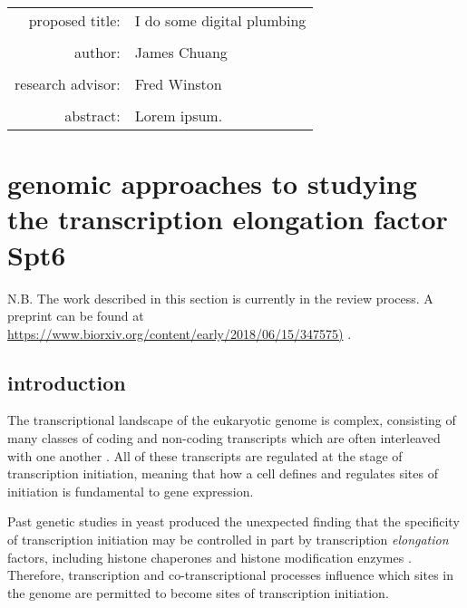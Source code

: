 \documentclass[11pt, a4paper]{article}
\begin{document}
\begin{titlepage}
\begin{tabular}{ r l }
 proposed title:   & I do some digital plumbing \\
 		   & \\
 author:	   & James Chuang \\
 		   & \\
 research advisor: & Fred Winston \\
 		   & \\
 abstract:	   & Lorem ipsum.
\end{tabular}
\end{titlepage}

\tableofcontents

\section{genomic approaches to studying the transcription elongation factor Spt6}

N.B. The work described in this section is currently in the review process. A preprint can be found at \url{https://www.biorxiv.org/content/early/2018/06/15/347575)} \cite{doris2018}.

\subsection{introduction}

The transcriptional landscape of the eukaryotic genome is complex, consisting of many classes of coding and non-coding transcripts which are often interleaved with one another \cite{jensen2013, pelechano2017}. All of these transcripts are regulated at the stage of transcription initiation, meaning that how a cell defines and regulates sites of initiation is fundamental to gene expression.

Past genetic studies in yeast produced the unexpected finding that the specificity of transcription initiation may be controlled in part by transcription \textit{elongation} factors, including histone chaperones and histone modification enzymes \cite{kaplan2003, cheung2008, hennig2013}. Therefore, transcription and co-transcriptional processes influence which sites in the genome are permitted to become sites of transcription initiation.
\end{document}
